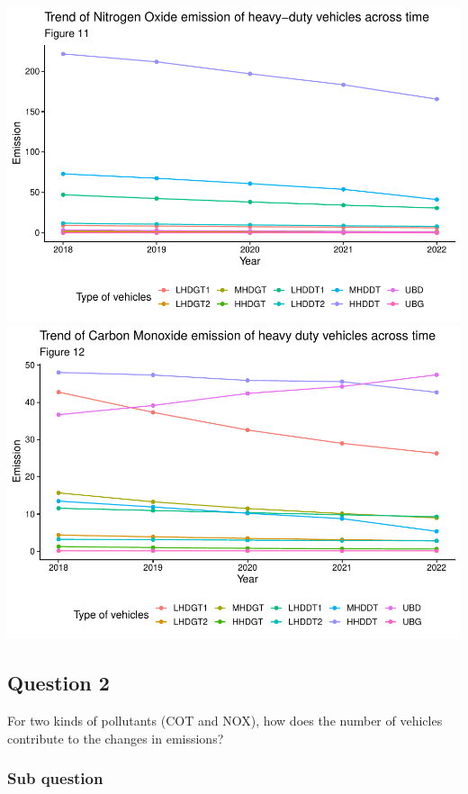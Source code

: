 \documentclass[
  12pt,
]{article}
\begin{document}
\includegraphics{Code_Main-Markdown_files/figure-latex/unnamed-chunk-8-1.pdf}
\includegraphics{Code_Main-Markdown_files/figure-latex/unnamed-chunk-8-2.pdf}

\hypertarget{question-2}{%
\subsection{Question 2}\label{question-2}}

For two kinds of pollutants (COT and NOX), how does the number of
vehicles contribute to the changes in emissions?

\hypertarget{sub-question}{%
\subsubsection{Sub question}\label{sub-question}}
\end{document}
